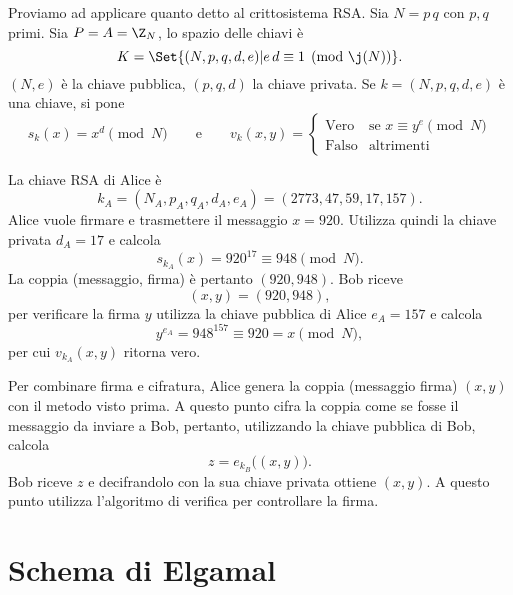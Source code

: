 	Proviamo ad applicare quanto detto al crittosistema RSA.
	Sia \(N=p\,q\) con \(p,q\) primi. Sia \(P=A=\Z_N\), lo spazio delle chiavi è
		\[
		K = \Set{(N,p,q,d,e) | e\,d \equiv 1 \pmod{\j(N)}}.
		\]
	\((N,e)\) è la chiave pubblica, \((p,q,d)\) la chiave privata. Se \(k=(N,p,q,d,e)\) è una chiave, si pone
		\[
		s_k(x) = x^d \pmod{N} \qquad\text{e}\qquad v_k(x,y) = 	\begin{cases}
																\text{Vero} & \text{se }x \equiv y^e \pmod{N}\\
																\text{Falso} & \text{altrimenti}
																\end{cases}
		\]

	\begin{ese}
	La chiave RSA di Alice è
		\[
		k_A = (N_A,p_A,q_A,d_A,e_A) = (2773,47,59,17,157).
		\]
	Alice vuole firmare e trasmettere il messaggio \(x=920\). Utilizza quindi la chiave privata \(d_A=17\) e calcola
		\[
		s_{k_A}(x) = 920^{17} \equiv 948 \pmod{N}.
		\]
	La coppia (messaggio, firma) è pertanto \((920,948)\).
	Bob riceve
		\[
	 	(x,y) = (920,948),
	 	\] 
	 per verificare la firma \(y\) utilizza la chiave pubblica di Alice \(e_A=157\) e calcola
	 	\[
	 	y^{e_A} = 948^{157} \equiv 920 = x\pmod{N},
	 	\]
	 per cui \(v_{k_A}(x,y)\) ritorna vero.
	\end{ese}

	\begin{oss}
	Per combinare firma e cifratura, Alice genera la coppia (messaggio firma) \((x,y)\) con il metodo visto prima. A questo punto cifra la coppia come se fosse il messaggio da inviare a Bob, pertanto, utilizzando la chiave pubblica di Bob, calcola
		\[
		z = e_{k_B}\big((x,y)\big).
		\]
	Bob riceve \(z\) e decifrandolo con la sua chiave privata ottiene \((x,y)\). A questo punto utilizza l'algoritmo di verifica per controllare la firma.
	\end{oss}

\section{Schema di Elgamal}

